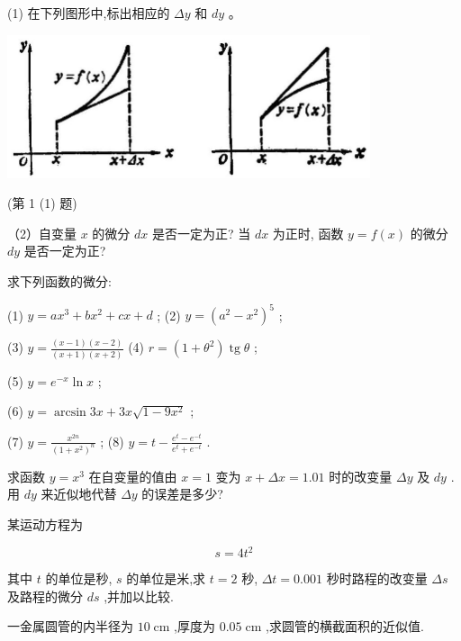 \documentclass[lang=cn,newtx,10pt,scheme=chinese]{elegantbook}
\begin{document}
\begin{problemset}[习 题 八]

\item (1) 在下列图形中,标出相应的 \({\Delta y}\) 和 \({dy}\) 。

\begin{center}
\includegraphics[max width=0.8\textwidth]{images/01912c18-5c3f-733d-b775-749ba9897a9d_121_587843.jpg}
\end{center}

(第 1 (1) 题)

（2）自变量 \(x\) 的微分 \({dx}\) 是否一定为正? 当 \({dx}\) 为正时, 函数 \(y = f\left( x\right)\) 的微分 \({dy}\) 是否一定为正?

\item 求下列函数的微分:

(1) \(y = a{x}^{3} + b{x}^{2} + {cx} + d\) ; (2) \(y = {\left( {a}^{2} - {x}^{2}\right) }^{5}\) ;

(3) \(y = \frac{\left( {x - 1}\right) \left( {x - 2}\right) }{\left( {x + 1}\right) \left( {x + 2}\right) }\) (4) \(r = \left( {1 + {\theta }^{2}}\right) \operatorname{tg}\theta\) ;

(5) \(y = {e}^{-x}\ln x\) ;

(6) \(y = \arcsin {3x} + {3x}\sqrt{1 - 9{x}^{2}}\) ;

(7) \(y = \frac{{x}^{2n}}{{\left( 1 + {x}^{2}\right) }^{n}}\) ; (8) \(y = t - \frac{{e}^{t} - {e}^{-t}}{{e}^{t} + {e}^{-t}}\) .

\item 求函数 \(y = {x}^{3}\) 在自变量的值由 \(x = 1\) 变为 \(x + {\Delta x} = {1.01}\) 时的改变量 \({\Delta y}\) 及 \({dy}\) . 用 \({dy}\) 来近似地代替 \({\Delta y}\) 的误差是多少?

\item 某运动方程为

\[
s = 4{t}^{2}
\]

其中 \(t\) 的单位是秒, \(s\) 的单位是米,求 \(t = 2\) 秒, \({\Delta t} = {0.001}\) 秒时路程的改变量 \({\Delta s}\) 及路程的微分 \({ds}\) ,并加以比较.

\item 一金属圆管的内半径为 \({10}\mathrm{\;{cm}}\) ,厚度为 \({0.05}\mathrm{\;{cm}}\) ,求圆管的横截面积的近似值.


\end{problemset}
\end{document}
